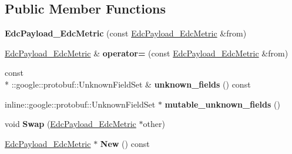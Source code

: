 \subsection*{Public Member Functions}
\begin{DoxyCompactItemize}
\item 
\hypertarget{classedcdatatypes_1_1_edc_payload___edc_metric_af17d1d30109093f9954a213730e2b955}{{\bfseries Edc\-Payload\-\_\-\-Edc\-Metric} (const \hyperlink{classedcdatatypes_1_1_edc_payload___edc_metric}{Edc\-Payload\-\_\-\-Edc\-Metric} \&from)}\label{classedcdatatypes_1_1_edc_payload___edc_metric_af17d1d30109093f9954a213730e2b955}

\item 
\hypertarget{classedcdatatypes_1_1_edc_payload___edc_metric_af3060bd659973e76d30c9c7be7c4e151}{\hyperlink{classedcdatatypes_1_1_edc_payload___edc_metric}{Edc\-Payload\-\_\-\-Edc\-Metric} \& {\bfseries operator=} (const \hyperlink{classedcdatatypes_1_1_edc_payload___edc_metric}{Edc\-Payload\-\_\-\-Edc\-Metric} \&from)}\label{classedcdatatypes_1_1_edc_payload___edc_metric_af3060bd659973e76d30c9c7be7c4e151}

\item 
\hypertarget{classedcdatatypes_1_1_edc_payload___edc_metric_a55e6c70e573e23194060c0719f7199d9}{const \\*
\-::google\-::protobuf\-::\-Unknown\-Field\-Set \& {\bfseries unknown\-\_\-fields} () const }\label{classedcdatatypes_1_1_edc_payload___edc_metric_a55e6c70e573e23194060c0719f7199d9}

\item 
\hypertarget{classedcdatatypes_1_1_edc_payload___edc_metric_a2a3273294cbd02b692aa87062fc339d5}{inline\-::google\-::protobuf\-::\-Unknown\-Field\-Set $\ast$ {\bfseries mutable\-\_\-unknown\-\_\-fields} ()}\label{classedcdatatypes_1_1_edc_payload___edc_metric_a2a3273294cbd02b692aa87062fc339d5}

\item 
\hypertarget{classedcdatatypes_1_1_edc_payload___edc_metric_af772271c6de213d60263152a123c1ba2}{void {\bfseries Swap} (\hyperlink{classedcdatatypes_1_1_edc_payload___edc_metric}{Edc\-Payload\-\_\-\-Edc\-Metric} $\ast$other)}\label{classedcdatatypes_1_1_edc_payload___edc_metric_af772271c6de213d60263152a123c1ba2}

\item 
\hypertarget{classedcdatatypes_1_1_edc_payload___edc_metric_ae8c523980f42a370b3d8e452522222a3}{\hyperlink{classedcdatatypes_1_1_edc_payload___edc_metric}{Edc\-Payload\-\_\-\-Edc\-Metric} $\ast$ {\bfseries New} () const }\label{classedcdatatypes_1_1_edc_payload___edc_metric_ae8c523980f42a370b3d8e452522222a3}


\end{DoxyCompactItemize}
